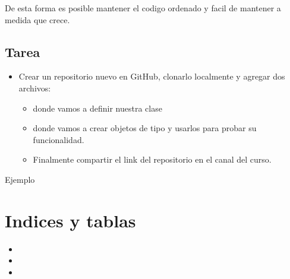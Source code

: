 \documentclass[a4paper,12pt,spanish]{sphinxmanual}
\begin{document}
\sphinxAtStartPar
De esta forma es posible mantener el codigo ordenado y facil de mantener a medida que crece.


\section{Tarea}
\label{\detokenize{my-modules:tarea}}\begin{itemize}
\item {} 
\sphinxAtStartPar
Crear un repositorio nuevo en GitHub, clonarlo localmente y agregar dos archivos:
\begin{itemize}
\item {} 
\sphinxAtStartPar
{} donde vamos a definir nuestra clase 

\item {} 
\sphinxAtStartPar
{} donde vamos a crear objetos de tipo  y usarlos para probar su funcionalidad.

\item {} 
\sphinxAtStartPar
Finalmente compartir el link del repositorio en el canal del curso.

\end{itemize}

\end{itemize}

\sphinxAtStartPar
Ejemplo

\noindent{}


\chapter{Indices y tablas}
\label{\detokenize{index:indices-y-tablas}}\begin{itemize}
\item {} 
\sphinxAtStartPar
{}

\item {} 
\sphinxAtStartPar
{}

\item {} 
\sphinxAtStartPar
{}

\end{itemize}



\renewcommand{\indexname}{Índice}
\printindex
\end{document}
